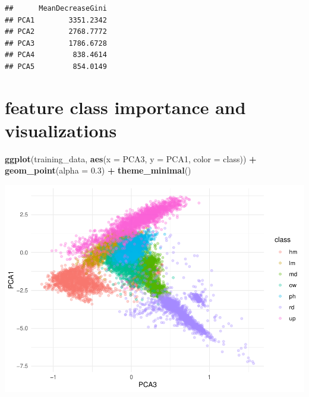 \documentclass[
]{article}
\newenvironment{Shaded}{\begin{snugshade}}{\end{snugshade}}
\newcommand{\AttributeTok}[1]{\textcolor[rgb]{0.13,0.29,0.53}{#1}}
\newcommand{\CommentTok}[1]{\textcolor[rgb]{0.56,0.35,0.01}{\textit{#1}}}
\newcommand{\ConstantTok}[1]{\textcolor[rgb]{0.56,0.35,0.01}{#1}}
\newcommand{\FloatTok}[1]{\textcolor[rgb]{0.00,0.00,0.81}{#1}}
\newcommand{\FunctionTok}[1]{\textcolor[rgb]{0.13,0.29,0.53}{\textbf{#1}}}
\newcommand{\NormalTok}[1]{#1}
\newcommand{\SpecialCharTok}[1]{\textcolor[rgb]{0.81,0.36,0.00}{\textbf{#1}}}
\newcommand{\StringTok}[1]{\textcolor[rgb]{0.31,0.60,0.02}{#1}}
\begin{document}
\begin{Shaded}
\end{Shaded}

\begin{verbatim}
##      MeanDecreaseGini
## PCA1        3351.2342
## PCA2        2768.7772
## PCA3        1786.6728
## PCA4         838.4614
## PCA5         854.0149
\end{verbatim}

\section{feature class importance and
visualizations}\label{feature-class-importance-and-visualizations-3}

\begin{Shaded}
\begin{Highlighting}[]
\FunctionTok{ggplot}\NormalTok{(training\_data, }\FunctionTok{aes}\NormalTok{(}\AttributeTok{x =}\NormalTok{ PCA3, }\AttributeTok{y =}\NormalTok{ PCA1, }\AttributeTok{color =}\NormalTok{ class)) }\SpecialCharTok{+}
  \FunctionTok{geom\_point}\NormalTok{(}\AttributeTok{alpha =} \FloatTok{0.3}\NormalTok{) }\SpecialCharTok{+}
  \FunctionTok{theme\_minimal}\NormalTok{()}
\end{Highlighting}
\end{Shaded}

\includegraphics{veg_model_files/figure-latex/unnamed-chunk-17-1.pdf}
\end{document}

